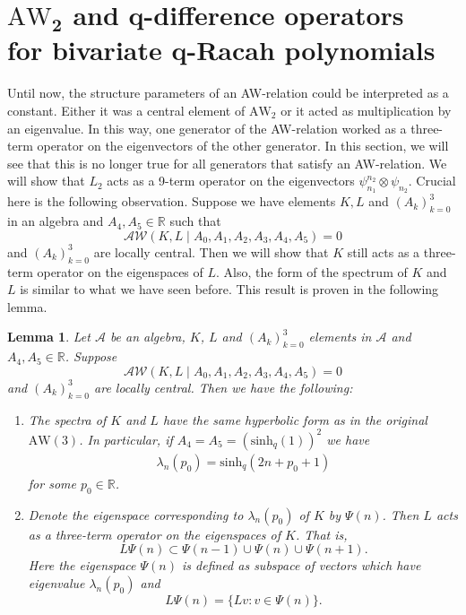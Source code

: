 \documentclass[10pt,a4paper]{amsart}
\numberwithin{equation}{section}
\newtheorem{Lemma}[Theorem]{Lemma}
\newcommand{\RR}{\mathbb{R}}
\newcommand{\A}{{\mathscr A}}
\newcommand{\aw}{\mathrm{AW}\!\left(3\right)}
\newcommand{\AW}[1]{\mathrm{AW}_{#1}}
\newcommand{\awr}{\mathscr{A}\!\!\mathscr{W}}
\newcommand{\shq}{\mathrm{sinh}_q}
\begin{document}
\section[AW\_2 and q-difference operators for bivariate q-Racah polynomials]{$\boldsymbol{\AW{2}}$ and $\boldsymbol{q}$-difference operators\\ for bivariate $\boldsymbol{q}$-Racah polynomials}\label{sec:qdif}

Until now, the structure parameters of an AW-relation could be interpreted as a constant. Either it was a central element of $\AW{2}$ or it acted as multiplication by an eigenvalue. In this way, one generator of the AW-relation worked as a three-term operator on the eigenvectors of the other generator. In this section, we will see that this is no longer true for all generators that satisfy an AW-relation. We will show that $L_2$ acts as a 9-term operator on the eigenvectors $\psi_{n_1}^{n_2}\otimes \psi_{n_2}$. Crucial here is the following observation. Suppose we have elements $K,L$ and $(A_k)_{k=0}^3$ in an algebra and $A_4,A_5\in\RR$ such that
\[
\awr(K,L\mid A_0,A_1,A_2,A_3,A_4,A_5)=0
\]
and $(A_k)_{k=0}^3$ are locally central. Then we will show that $K$ still acts as a three-term operator on the eigenspaces of $L$. Also, the form of the spectrum of $K$ and $L$ is similar to what we have seen before. This result is proven in the following lemma.
\begin{Lemma}\label{lem:threetermeigenspace}
	Let $\A$ be an algebra, $K$, $L$ and $(A_k)_{k=0}^3$ elements in $\A$ and $A_4,A_5\in\RR$. Suppose
	\[
	\awr(K,L\mid A_0,A_1,A_2,A_3,A_4,A_5)=0
	\]
	and $(A_k)_{k=0}^3$ are locally central. Then we have the following:
\begin{enumerate}\itemsep=0pt
		\item[$(i)$] The spectra of $K$ and $L$ have the same hyperbolic form as in the original $\aw$. In particular, if $A_4=A_5=(\shq(1))^2$ we have
		\begin{gather*}
			\lambda_n(p_0)=\shq(2n+p_0+1)%
		\end{gather*}
		for some $p_0\in\RR$.
		\item[$(ii)$] Denote the eigenspace corresponding to $\lambda_n(p_0)$ of $K$ by $\Psi(n)$. Then $L$ acts as a three-term operator on the eigenspaces of $K$. That is,
		\[
		L \Psi(n) \subset \Psi(n-1)\cup \Psi(n)\cup\Psi(n+1).
		\]
		Here the eigenspace $\Psi(n)$ is defined as subspace of vectors which have eigenvalue $\lambda_n(p_0)$ and
		\[
		L \Psi(n)=\{ Lv\colon v\in\Psi(n)\}.
		\]
	\end{enumerate}
\end{Lemma}
\end{document}
